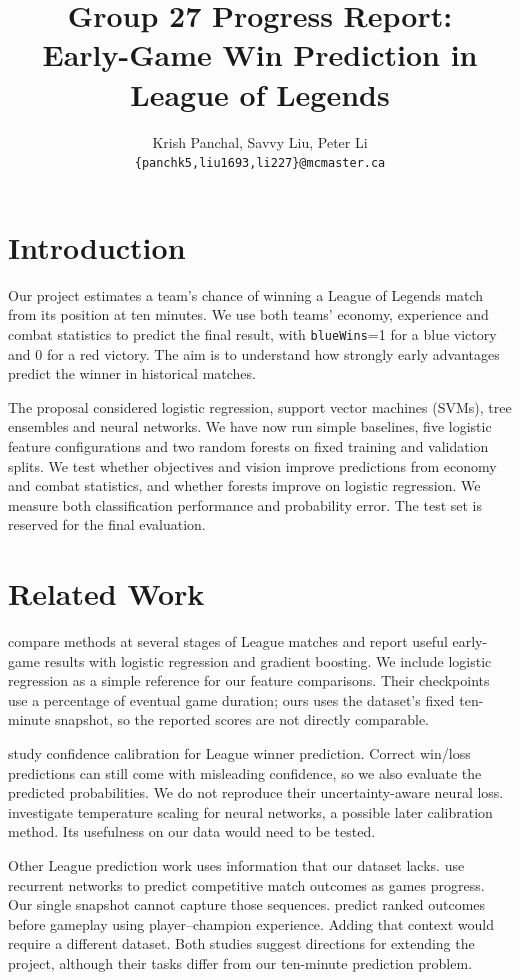 \documentclass[11pt]{article}
\title{Group 27 Progress Report:\\Early-Game Win Prediction in League of Legends}
\author{Krish Panchal, Savvy Liu, Peter Li \\
\texttt{\{panchk5,liu1693,li227\}@mcmaster.ca}}
\begin{document}
\maketitle

\section{Introduction}

Our project estimates a team's chance of winning a League of Legends match from its position at ten minutes. We use both teams' economy, experience and combat statistics to predict the final result, with \texttt{blueWins}=1 for a blue victory and 0 for a red victory. The aim is to understand how strongly early advantages predict the winner in historical matches.

The proposal considered logistic regression, support vector machines (SVMs), tree ensembles and neural networks. We have now run simple baselines, five logistic feature configurations and two random forests on fixed training and validation splits. We test whether objectives and vision improve predictions from economy and combat statistics, and whether forests improve on logistic regression. We measure both classification performance and probability error. The test set is reserved for the final evaluation.

\section{Related Work}

\citet{junior2023} compare methods at several stages of League matches and report useful early-game results with logistic regression and gradient boosting. We include logistic regression as a simple reference for our feature comparisons. Their checkpoints use a percentage of eventual game duration; ours uses the dataset's fixed ten-minute snapshot, so the reported scores are not directly comparable.

\citet{kim2020} study confidence calibration for League winner prediction. Correct win/loss predictions can still come with misleading confidence, so we also evaluate the predicted probabilities. We do not reproduce their uncertainty-aware neural loss. \citet{guo2017} investigate temperature scaling for neural networks, a possible later calibration method. Its usefulness on our data would need to be tested.

Other League prediction work uses information that our dataset lacks. \citet{silva2018} use recurrent networks to predict competitive match outcomes as games progress. Our single snapshot cannot capture those sequences. \citet{do2021} predict ranked outcomes before gameplay using player--champion experience. Adding that context would require a different dataset. Both studies suggest directions for extending the project, although their tasks differ from our ten-minute prediction problem.
\end{document}
